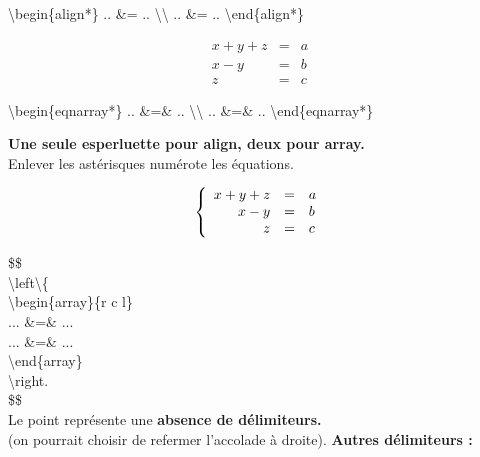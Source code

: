 \documentclass{report}
\begin{document}
\begin{center}
{\selectfont
\textbackslash{}begin\{align*\} .. \&= .. \textbackslash{}\textbackslash{} .. \&= .. \textbackslash{}end\{align*\}
}\\
\end{center}

\begin{eqnarray*}
x + y + z &=& a\\
x - y &=& b\\
z &=& c
\end{eqnarray*}

\begin{center}
{\selectfont
\textbackslash{}begin\{eqnarray*\} .. \&=\& .. \textbackslash{}\textbackslash{} .. \&=\& .. \textbackslash{}end\{eqnarray*\}
}\\
\end{center}

\textbf{Une seule esperluette pour align, deux pour  array.}\\
Enlever les astérisques numérote les équations. 

$$
\left\{
\begin{array}{r c l}
x + y + z &=& a\\
x - y &=& b\\
z &=& c
\end{array}
\right.
$$

{\selectfont
\$\$ \\
\textbackslash{}left\textbackslash{}\{ \\
\textbackslash{}begin\{array\}\{r c l\} \\
... \&=\& ... \\
... \&=\& ... \\
\textbackslash{}end\{array\} \\
\textbackslash{}right. \\
\$\$
} \\
Le point représente une \textbf{absence de délimiteurs.} \\
(on pourrait choisir de refermer l'accolade à droite).
\bigskip
\textbf{Autres délimiteurs :}
\end{document}
